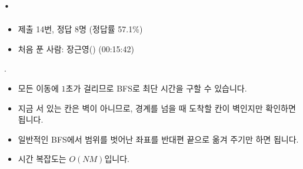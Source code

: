 
\section{\texorpdfstring{\pletter. \ptitle}{문제 \pletter}}

\begin{frame}[label=problem-F]
    \sectiontitle{\pletter}{\ptitle}
    \begin{itemize}
        \item 제출 14번, 정답 8명 (정답률 57.1\%)
        \item 처음 푼 사람: 장근영() (00:15:42)
    \end{itemize}
\end{frame}

\begin{frame}{\textbf{\pletter}. \ptitle}
    \begin{itemize}
        \item 모든 이동에 $1$초가 걸리므로 BFS로 최단 시간을 구할 수 있습니다.
        \item 지금 서 있는 칸은 벽이 아니므로, 경계를 넘을 때 도착할 칸이 벽인지만 확인하면 됩니다.
        \item 일반적인 BFS에서 범위를 벗어난 좌표를 반대편 끝으로 옮겨 주기만 하면 됩니다.
        \item 시간 복잡도는 $O(NM)$입니다.
    \end{itemize}
\end{frame}
